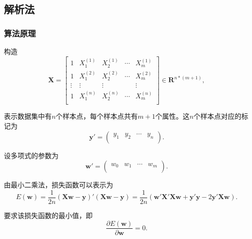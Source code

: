 \documentclass[withoutpreface,bwprint]{cumcmthesis}
\begin{document}
\subsection{解析法}
\subsubsection{算法原理}
构造
\begin{equation*}
\boldsymbol{X}=
\begin{bmatrix}
 1&X_{1}^{\left(1\right)}  &X_{2}^{\left(1\right)}  & \cdots & X_{m}^{\left(1\right)}\\ 
 1&X_{1}^{\left(2\right)}  &X_{2}^{\left(2\right)}  & \cdots & X_{m}^{\left(2\right)}\\ 
 \vdots&\vdots&\vdots&  &\vdots \\ 
 1&X_{1}^{\left(n\right)}  &X_{2}^{\left(n\right)}  & \cdots & X_{m}^{\left(n\right)}\\ 
\end{bmatrix}
\in \boldsymbol{R}^{n*\left(m+1\right)},
\end{equation*}

表示数据集中有$n$个样本点，每个样本点共有$m+1$个属性。这$n$个样本点对应的标记为
\begin{equation*}
{\boldsymbol{y}}'=
\begin{pmatrix}
y_{1} & y_{2} &\cdots & y_{n}\\
\end{pmatrix}.
\end{equation*}

设多项式的参数为
\begin{equation*}
{\boldsymbol{w}}'=
\begin{pmatrix}
w_{0} & w_{1} &\cdots & w_{m}\\
\end{pmatrix}.
\end{equation*}

由最小二乘法，损失函数可以表示为
\begin{equation*}
E(\boldsymbol{w})=\frac{1}{2n}{\left(\boldsymbol{Xw}-\boldsymbol{y}\right)}'\left(\boldsymbol{Xw}-\boldsymbol{y}\right)
=\frac{1}{2n}\left(\boldsymbol{{w}'{X}'Xw}+\boldsymbol{{y}'y}-2\boldsymbol{{y}'Xw} \right).
\end{equation*}

要求该损失函数的最小值，即
\begin{equation*}
\frac{\partial{E\left(\boldsymbol{w}\right)}}{\partial{\boldsymbol{w}}}=0.
\end{equation*}
\end{document}
